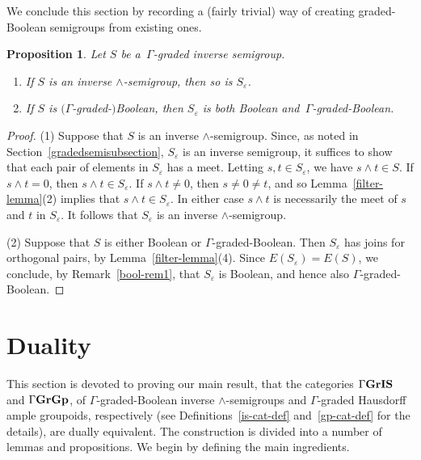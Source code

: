\documentclass[a4paper,reqno,12pt]{amsart}
\numberwithin{equation}{section}
\theoremstyle{plain}
\newtheorem{prop}[thm]{Proposition}
\theoremstyle{definition}
\newcommand{\GIS}{\operatorname{\Gamma\bf{GrIS}}}
\newcommand{\GG}{\operatorname{\Gamma\bf{GrGp}}}
\begin{document}
We conclude this section by recording a (fairly trivial) way of creating graded-Boolean semigroups from existing ones.

\begin{prop}
Let $S$ be a $\, \Gamma$-graded inverse semigroup.
\begin{enumerate}[\upshape(1)]
\item If $S$ is an inverse $\land$-semigroup, then so is $S_{\varepsilon}$.

\smallskip 

\item If $S$ is $($$\Gamma$-graded-$)$Boolean, then $S_{\varepsilon}$ is both Boolean and $\, \Gamma$-graded-Boolean.
\end{enumerate}
\end{prop}

\begin{proof}
(1) Suppose that $S$ is an inverse $\land$-semigroup. Since, as noted in Section~\ref{gradedsemisubsection}, $S_{\varepsilon}$ is an inverse semigroup, it suffices to show that each pair of elements in $S_{\varepsilon}$ has a meet. Letting $s,t \in S_{\varepsilon}$, we have $s\land t \in S$. If $s\land t = 0$, then $s\land t \in S_{\varepsilon}$. If $s\land t \neq 0$, then $s \neq 0 \neq t$, and so Lemma~\ref{filter-lemma}(2) implies that $s\land t \in S_{\varepsilon}$. In either case $s\land t$ is necessarily the meet of $s$ and $t$ in $S_{\varepsilon}$. It follows that $S_{\varepsilon}$ is an inverse $\land$-semigroup.

\smallskip

(2) Suppose that $S$ is either Boolean or $\Gamma$-graded-Boolean. Then $S_{\varepsilon}$ has joins for orthogonal pairs, by Lemma~\ref{filter-lemma}(4). Since $E(S_{\varepsilon}) = E(S)$, we conclude, by Remark~\ref{bool-rem1}, that $S_{\varepsilon}$ is Boolean, and hence also $\Gamma$-graded-Boolean.
\end{proof}

\section{Duality} \label{duality-sect}

This section is devoted to proving our main result, that the categories $\GIS$ and $\GG$, of $\Gamma$-graded-Boolean inverse $\land$-semigroups and $\Gamma$-graded Hausdorff ample groupoids, respectively (see Definitions~\ref{is-cat-def} and~\ref{gp-cat-def} for the details), are dually equivalent. The construction is divided into a number of lemmas and propositions. We begin by defining the main ingredients.
\end{document}

